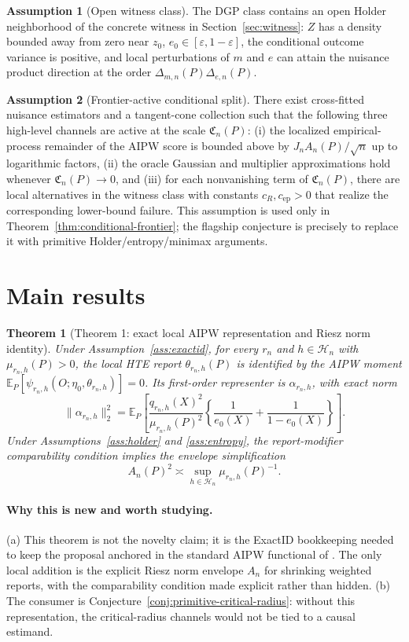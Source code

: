 \documentclass[11pt]{article}
\newcommand{\E}{\mathbb{E}}
\newcommand{\calH}{\mathcal{H}}
\theoremstyle{definition}
\newtheorem{assumption}{Assumption}
\theoremstyle{plain}
\newtheorem{theorem}{Theorem}
\theoremstyle{remark}
\begin{document}
\begin{assumption}[Open witness class]\label{ass:witness}
The DGP class contains an open Holder neighborhood of the concrete witness in
Section~\ref{sec:witness}: \(Z\) has a density bounded away from zero near
\(z_0\), \(e_0\in[\varepsilon,1-\varepsilon]\), the conditional outcome
variance is positive, and local perturbations of \(m\) and \(e\) can attain
the nuisance product direction at the order
\(\Delta_{m,n}(P)\Delta_{e,n}(P)\).
\end{assumption}

\begin{assumption}[Frontier-active conditional split]\label{ass:frontier-active}
There exist cross-fitted nuisance estimators and a tangent-cone collection
such that the following three high-level channels are active at the scale
\(\mathfrak C_n(P)\): (i) the localized empirical-process remainder of the
AIPW score is bounded above by \(J_nA_n(P)/\sqrt n\) up to logarithmic
factors, (ii) the oracle Gaussian and multiplier approximations hold whenever
\(\mathfrak C_n(P)\to0\), and (iii) for each nonvanishing term of
\(\mathfrak C_n(P)\), there are local alternatives in the witness class with
constants \(c_R,c_{\mathrm{ep}}>0\) that realize the corresponding lower-bound
failure.  This assumption is used only in
Theorem~\ref{thm:conditional-frontier}; the flagship conjecture is precisely
to replace it with primitive Holder/entropy/minimax arguments.
\end{assumption}

\section{Main results}
\begin{theorem}[Theorem 1: exact local AIPW representation and Riesz norm identity]\label{thm:id}
Under Assumption~\ref{ass:exactid}, for every \(r_n\) and
\(h\in\calH_n\) with \(\mu_{r_n,h}(P)>0\), the local HTE report
\(\theta_{r_n,h}(P)\) is identified by the AIPW moment
\(\E_P[\psi_{r_n,h}(O;\eta_0,\theta_{r_n,h})]=0\).  Its first-order
representer is \(\alpha_{r_n,h}\), with exact norm
\[
\|\alpha_{r_n,h}\|_2^2=
\E_P\left[
\frac{q_{r_n,h}(X)^2}{\mu_{r_n,h}(P)^2}
\left\{\frac{1}{e_0(X)}+\frac{1}{1-e_0(X)}\right\}
\right].
\]
Under Assumptions~\ref{ass:holder} and \ref{ass:entropy}, the report-modifier
comparability condition implies the envelope simplification
\[
A_n(P)^2\asymp
\sup_{h\in\calH_n}\mu_{r_n,h}(P)^{-1}.
\]
\end{theorem}
\paragraph{Why this is new and worth studying.}
(a) This theorem is not the novelty claim; it is the ExactID bookkeeping
needed to keep the proposal anchored in the standard AIPW functional of
\citet{ChernozhukovEtAl2018DML}.  The only local addition is the explicit
Riesz norm envelope \(A_n\) for shrinking weighted reports, with the
comparability condition made explicit rather than hidden.  (b) The consumer
is Conjecture~\ref{conj:primitive-critical-radius}: without this
representation, the critical-radius channels would not be tied to a causal
estimand.
\end{document}
